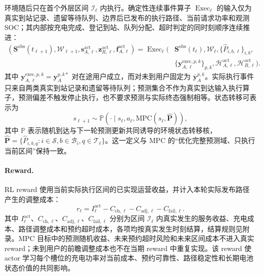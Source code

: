 \documentclass[12pt,a4paper,UTF8]{ctexart}
\begin{document}
环境随后只在首个外层区间 $\mathcal I_\ell$ 内执行。确定性连续事件算子 $\operatorname{Exec}_\ell$ 的输入仅为真实到站记录、遗留等待队列、边界后已发布的执行路径、当前请求功率和观测 SOC；其内部按充电完成、登记到站、队列分配、超时判定的同时刻顺序连续推进：
\begin{equation}
\begin{aligned}
(\mathbf S^{\mathrm{obs}}(t_{\ell+1}),\mathcal W_{\ell+1},
\mathbf s_{A,\ell}^{\mathrm{act}},\mathbf z_{R,\ell}^{\mathrm{act}},
\mathbf f_{A,\ell}^{\mathrm{act}})
=\operatorname{Exec}_\ell\!\Big(&
\mathbf S^{\mathrm{obs}}(t_\ell),\mathcal W_\ell,
\{\widehat P_{i,b,\ell}\}_{i,b},\\
&\{\mathbf y_{A,\ell}^{\mathrm{exec},p,k}\}_{p,k},
\mathcal H_{A,\ell}^{\mathrm{act}},\mathcal H_{R,\ell}^{\mathrm{act}}
\Big).
\end{aligned}
\label{eq:actual_execution_operator}
\end{equation}
其中 $\mathbf y_{A,\ell}^{\mathrm{exec},p,k}=\mathbf y_A^{p,k*}$ 对在途用户成立，而对未到用户固定为 $\bar{\mathbf y}_{A}^{p,k}$。实际执行事件只来自两类真实到站记录和遗留等待队列；预测集合不作为真实到达输入执行算子，预测偏差不触发停止执行，也不要求预测与实际终态强制相等。状态转移可表示为
\begin{equation}
s_{\ell+1}
\sim
\mathbb P\!\left(
\cdot\mid
s_\ell,a_\ell,
\mathrm{MPC}(s_\ell,\widehat{\mathbf P})
\right),
\label{eq:rl_transition}
\end{equation}
其中 $\mathbb P$ 表示随机到达与下一轮预测更新共同诱导的环境状态转移核，$\widehat{\mathbf P}=\{\widehat P_{i,b,q}:i\in\mathcal S,b\in\mathcal B_i,q\in\mathcal T_\ell\}$。这一定义与 MPC 的“优化完整预测域、只执行当前区间”保持一致。

\paragraph{Reward.}
RL reward 使用当前实际执行区间的已实现运营收益，并计入本轮实际发布路径产生的调整成本：
\begin{equation}
r_\ell
=
I_\ell^{\mathrm{act}}
-C_{\mathrm{ch},\ell}
-C_{\mathrm{adj},\ell}
-C_{\mathrm{fail},\ell}.
\label{eq:rl_reward}
\end{equation}
其中 $I_\ell^{\mathrm{act}}$、$C_{\mathrm{ch},\ell}$、$C_{\mathrm{adj},\ell}$、$C_{\mathrm{fail},\ell}$ 分别为区间 $\mathcal I_\ell$ 内真实发生的服务收益、充电成本、路径调整成本和预约超时成本，各项均按真实发生时刻结算，结算规则见附录。MPC 目标中的预测随机收益、未来预约超时风险和未来区间成本不进入真实 reward；未到用户的前瞻调整成本也不在当期 reward 中重复实现。该 reward 使 actor 学习每个槽位的充电功率对当前成本、预约可靠性、路径稳定性和长期电池状态价值的共同影响。
\end{document}
